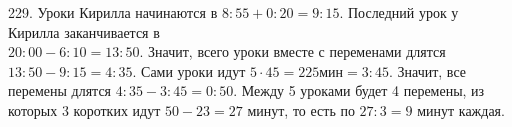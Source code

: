 229. Уроки Кирилла начинаются в $8:55+0:20=9:15.$ Последний урок у Кирилла заканчивается в \\ $20:00-6:10=13:50.$ Значит, всего уроки вместе с переменами длятся $13:50-9:15=4:35.$ Сами уроки идут $5\cdot45=225\text{мин}=3:45.$ Значит, все перемены длятся $4:35-3:45=0:50.$ Между 5 уроками будет 4 перемены, из которых 3 коротких идут $50-23=27$ минут, то есть по $27:3=9$ минут каждая.\\
